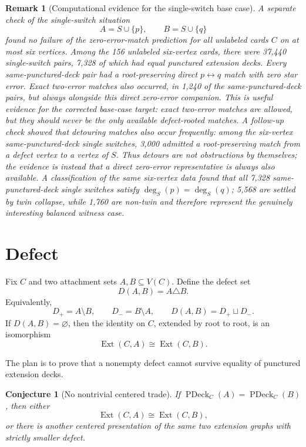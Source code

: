 \documentclass[11pt]{article}
\newtheorem{conjecture}{Conjecture}
\newtheorem{remark}{Remark}
\newcommand{\PDeck}{\operatorname{PDeck}}
\newcommand{\Ext}{\operatorname{Ext}}
\begin{document}
\begin{remark}[Computational evidence for the single-switch base case]
A separate check of the single-switch situation
\[
  A=S\cup\{p\},\qquad B=S\cup\{q\}
\]
found no failure of the zero-error-match prediction for all unlabeled cards
\(C\) on at most six vertices.  Among the 156 unlabeled six-vertex cards,
there were 37,440 single-switch pairs, 7,328 of which had equal punctured
extension decks.  Every same-punctured-deck pair had a root-preserving
direct \(p\leftrightarrow q\) match with zero star error.  Exact two-error
matches also occurred, in 1,240 of the same-punctured-deck pairs, but always
alongside this direct zero-error companion.  This is useful evidence for the
corrected base-case target: exact two-error matches are allowed, but they
should never be the only available defect-rooted matches.
A follow-up check showed that detouring matches also occur frequently: among
the six-vertex same-punctured-deck single switches, 3,000 admitted a
root-preserving match from a defect vertex to a vertex of \(S\).  Thus detours
are not obstructions by themselves; the evidence is instead that a direct
zero-error representative is always also available.
A classification of the same six-vertex data found that all 7,328
same-punctured-deck single switches satisfy
\(\deg_S(p)=\deg_S(q)\); 5,568 are settled by twin collapse, while 1,760 are
non-twin and therefore represent the genuinely interesting balanced witness
case.
\end{remark}

\section{Defect}

Fix \(C\) and two attachment sets \(A,B \subseteq V(C)\).  Define the defect
set
\[
  D(A,B) = A \triangle B.
\]
Equivalently,
\[
  D_+ = A \setminus B,
  \qquad
  D_- = B \setminus A,
  \qquad
  D(A,B) = D_+ \sqcup D_-.
\]
If \(D(A,B)=\varnothing\), then the identity on \(C\), extended by root to
root, is an isomorphism
\[
  \Ext(C,A) \cong \Ext(C,B).
\]

The plan is to prove that a nonempty defect cannot survive equality of
punctured extension decks.

\begin{conjecture}[No nontrivial centered trade]
If \(\PDeck_C(A)=\PDeck_C(B)\), then either
\[
  \Ext(C,A) \cong \Ext(C,B),
\]
or there is another centered presentation of the same two extension graphs
with strictly smaller defect.
\end{conjecture}
\end{document}
